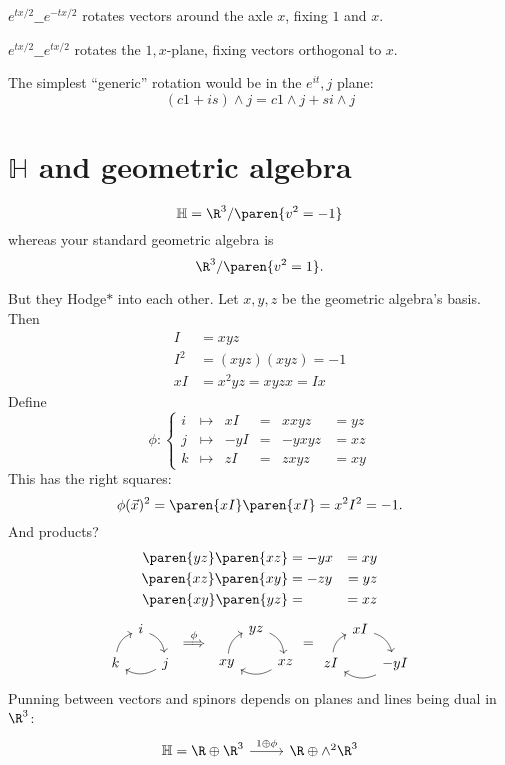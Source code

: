 \documentclass[draft]{scrartcl}
\newcommand{\ham}{\mathbb H}
\renewcommand{\blank}{\_\_}
\begin{document}
\begin{multicols*}{2}
\(e^{tx/2}\blank e^{-tx/2}\) rotates vectors around the axle \(x\), fixing \(1\) and \(x\).

\(e^{tx/2}\blank e^{tx/2}\) rotates the \(1,x\)-plane, fixing vectors orthogonal to \(x\).

The simplest ``generic'' rotation would be in the \(e^{it},j\)  plane:
\[
  (c1+is) \wedge j = c1\wedge j + s i \wedge j
\]
\section{\(\ham\) and geometric algebra}
\[
  \ham = \R^3/\paren{v^2=-1}
\]
whereas your standard geometric algebra is
\[
  \R^3/\paren{v^2=1}.
\]

But they Hodge\(*\) into each other. Let \(x,y,z\) be the geometric algebra's basis. Then
\begin{align*}
  I &= xyz  \\
  I^2 &= (xyz)(xyz) = -1 \\
  xI &= x^2yz = xyzx = Ix
\end{align*}
Define
\[
  \phi:
  \left\{
  \begin{matrix}
    i &\mapsto& xI &=&xxyz&= yz    \\
    j &\mapsto& -yI&=&-yxyz&= xz  \\
    k &\mapsto& zI &=&zxyz&= xy
  \end{matrix}
  \right.
\]
This has the right squares:
\[
  \phi(\vec x)^2 = \paren{xI}\paren{xI} = x^2I^2 = -1.
\]
And products?
\begin{align*}
  \paren{yz}\paren{xz} &= -yx &= xy \\
  \paren{xz}\paren{xy} &= -zy &=yz \\
  \paren{xy}\paren{yz} &= &=xz
\end{align*}
\[
  \begin{tikzcd}[row sep=1em,column sep = .5em]
    & i \ar[bend left]{dr}\\
    k\ar[bend left]{ur} & &j \ar[bend left]{ll}
  \end{tikzcd}
  \overset{\phi}{\implies}
  \begin{tikzcd}[row sep=1em,column sep = .4ex]
    & yz \ar[bend left]{dr}\\
    xy\ar[bend left]{ur} & &xz \ar[bend left]{ll}
  \end{tikzcd}
  =
  \begin{tikzcd}[row sep=1em,column sep = .4ex]
    & xI \ar[bend left]{dr}\\
    zI\ar[bend left]{ur} & &-yI \ar[bend left]{ll}
  \end{tikzcd}
\]
Punning between vectors and spinors depends on planes and lines being dual in \(\R^3\):
\[
  \begin{tikzcd}
    \ham = \R \oplus \R^3 \rar{1\oplus \phi}& \R\oplus \wedge^2\R^3
  \end{tikzcd}
\]

\end{multicols*}
\end{document}
